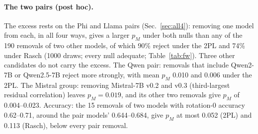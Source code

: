 \documentclass{article}
\theoremstyle{plain}
\theoremstyle{remark}
\begin{document}
\paragraph{The two pairs (post hoc).} The excess rests on the Phi and
Llama pairs (Sec.~\ref{sec:all4}): removing one model from each, in all
four ways, gives a larger $p_M$ under
both nulls than any of the 190 removals of two other models, of which 90\% reject under the 2PL and 74\% under Rasch (1000 draws; every
null adequate; Table~\ref{tab:fw}). Three other candidates do not carry
the excess. The Qwen pair: removals that include Qwen2-7B or Qwen2.5-7B
reject more strongly, with mean $p_M$ 0.010 and 0.006 under the 2PL.
The Mistral group: removing Mistral-7B v0.2 and v0.3 (third-largest
residual correlation) leaves $p_M=0.019$, and its other
two removals give $p_M$ of 0.004--0.023. Accuracy: the 15 removals
of two models with rotation-0 accuracy 0.62--0.71, around the pair
models' 0.644--0.684, give $p_M$ at most 0.052 (2PL) and 0.113 (Rasch), below every pair removal.
\end{document}
